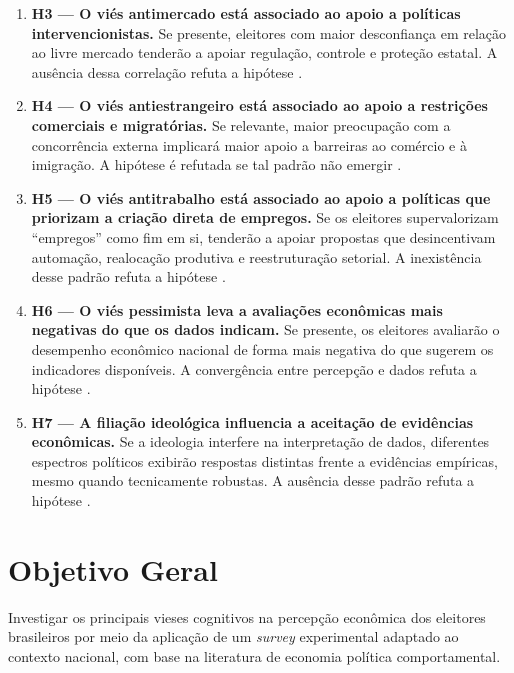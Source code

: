\begin{enumerate}[label=\alph*)]
  \item \textbf{H3 — O viés antimercado está associado ao apoio a políticas intervencionistas.}
  Se presente, eleitores com maior desconfiança em relação ao livre mercado tenderão a apoiar regulação, controle e proteção estatal. A ausência dessa correlação refuta a hipótese \cite{The_Myth_of_the_Rational_Voter,sowell2004applied}.

  \item \textbf{H4 — O viés antiestrangeiro está associado ao apoio a restrições comerciais e migratórias.}
  Se relevante, maior preocupação com a concorrência externa implicará maior apoio a barreiras ao comércio e à imigração. A hipótese é refutada se tal padrão não emergir \cite{The_Myth_of_the_Rational_Voter,bhagwati2003free}.

  \item \textbf{H5 — O viés antitrabalho está associado ao apoio a políticas que priorizam a criação direta de empregos.}
  Se os eleitores supervalorizam “empregos” como fim em si, tenderão a apoiar propostas que desincentivam automação, realocação produtiva e reestruturação setorial. A inexistência desse padrão refuta a hipótese \cite{The_Myth_of_the_Rational_Voter,landsburg2012armchair}.

  \item \textbf{H6 — O viés pessimista leva a avaliações econômicas mais negativas do que os dados indicam.}
  Se presente, os eleitores avaliarão o desempenho econômico nacional de forma mais negativa do que sugerem os indicadores disponíveis. A convergência entre percepção e dados refuta a hipótese \cite{The_Myth_of_the_Rational_Voter,easterbrook2004progress}.

  \item \textbf{H7 — A filiação ideológica influencia a aceitação de evidências econômicas.}
  Se a ideologia interfere na interpretação de dados, diferentes espectros políticos exibirão respostas distintas frente a evidências empíricas, mesmo quando tecnicamente robustas. A ausência desse padrão refuta a hipótese \cite{The_Myth_of_the_Rational_Voter,kahan2012polarization}.

\end{enumerate}

\section{Objetivo Geral}\label{sec:objetivo-geral}

Investigar os principais vieses cognitivos na percepção econômica dos eleitores brasileiros por meio da aplicação de um \textit{survey} experimental adaptado ao contexto nacional, com base na literatura de economia política comportamental.

